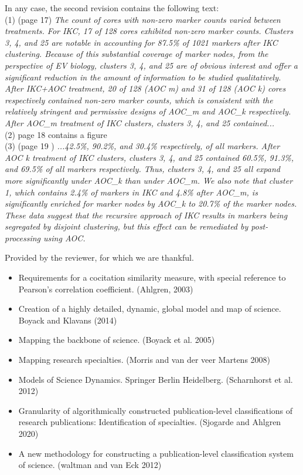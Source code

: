 \documentclass[11pt, oneside]{article}   	%
\begin{document}
\vspace{2 mm} 
In any case, the second revision contains the following text: \\

(1)  (page 17)   \emph{The count of cores with non-zero marker counts varied between treatments. For IKC, 17 of 128 cores exhibited non-zero marker counts. Clusters 3, 4, and 25 are notable in accounting for 87.5\% of 1021 markers after IKC clustering. Because of this substantial coverage of marker nodes, from the perspective of EV biology, clusters 3, 4, and 25 are of obvious interest and offer a significant reduction in the amount of information to be studied qualitatively.
After IKC+AOC treatment, 20 of 128 (AOC m) and 31 of 128 (AOC k) cores respectively contained non-zero marker counts, which is consistent with the relatively stringent and permissive designs of AOC\_m and AOC\_k respectively. After AOC\_m treatment of IKC clusters, clusters 3, 4, and 25 contained...}\\

(2) page 18 contains a figure\\

(3) (page 19 ) \emph{...42.5\%, 90.2\%, and 30.4\% respectively, of all markers. After AOC k treatment of IKC clusters, clusters 3, 4, and 25 contained 60.5\%, 91.3\%, and 69.5\% of all markers respectively. Thus, clusters 3, 4, and 25 all expand more significantly under AOC\_k than under AOC\_m. We also note that cluster 1, which contains 2.4\% of markers in IKC and 4.8\% after AOC\_m, is significantly enriched for marker nodes by AOC\_k to 20.7\% of the marker nodes. These data suggest that the recursive approach of IKC results in markers being segregated by disjoint clustering, but this effect can be remediated by post-processing using AOC.}


\vspace{4 mm}

Provided by the reviewer, for which we are thankful. 
\begin{itemize}
\item Requirements for a cocitation similarity measure, with special reference to Pearson’s correlation coefficient. (Ahlgren, 2003)
\item Creation of a highly detailed, dynamic, global model and map of science. Boyack and Klavans (2014)
\item Mapping the backbone of science. (Boyack et al. 2005) 
\item Mapping research specialties. (Morris and van der veer Martens 2008)
\item Models of Science Dynamics. Springer Berlin Heidelberg. (Scharnhorst et al. 2012)
\item Granularity of algorithmically constructed publication-level classifications of research publications: Identification of specialties. (Sjogarde and Ahlgren 2020)
\item A new methodology for constructing a publication-level classification system of science. (waltman and van Eck 2012)
\end{itemize}
\end{document}
